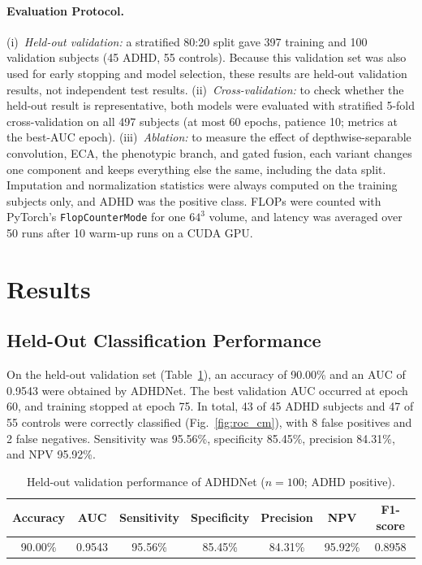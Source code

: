 \documentclass[runningheads]{llncs}
\begin{document}
\paragraph{Evaluation Protocol.}
(i)~\emph{Held-out validation:} a stratified 80:20 split gave 397 training and 100 validation subjects (45 ADHD, 55 controls). Because this validation set was also used for early stopping and model selection, these results are held-out validation results, not independent test results. (ii)~\emph{Cross-validation:} to check whether the held-out result is representative, both models were evaluated with stratified 5-fold cross-validation on all 497 subjects (at most 60 epochs, patience 10; metrics at the best-AUC epoch). (iii)~\emph{Ablation:} to measure the effect of depthwise-separable convolution, ECA, the phenotypic branch, and gated fusion, each variant changes one component and keeps everything else the same, including the data split. Imputation and normalization statistics were always computed on the training subjects only, and ADHD was the positive class. FLOPs were counted with PyTorch's \texttt{FlopCounterMode} for one $64^3$ volume, and latency was averaged over 50 runs after 10 warm-up runs on a CUDA GPU.%

\section{Results}

\subsection{Held-Out Classification Performance}
On the held-out validation set (Table~\ref{tab:results}), an accuracy of 90.00\% and an AUC of 0.9543 were obtained by ADHDNet. The best validation AUC occurred at epoch 60, and training stopped at epoch 75. In total, 43 of 45 ADHD subjects and 47 of 55 controls were correctly classified (Fig.~\ref{fig:roc_cm}), with 8 false positives and 2 false negatives. Sensitivity was 95.56\%, specificity 85.45\%, precision 84.31\%, and NPV 95.92\%.

\begin{table}[t]
\centering
\caption{Held-out validation performance of ADHDNet ($n=100$; ADHD positive).}
\label{tab:results}
\setlength{\tabcolsep}{5pt}
{\small
\begin{tabular}{ccccccc}
\toprule
Accuracy & AUC & Sensitivity & Specificity & Precision & NPV & F1-score \\
\midrule
90.00\% & 0.9543 & 95.56\% & 85.45\% & 84.31\% & 95.92\% & 0.8958 \\
\bottomrule
\end{tabular}}
\end{table}
\end{document}
